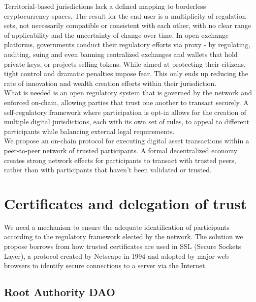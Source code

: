 \documentclass[10pt]{article}
\begin{document}
\noindent Territorial-based jurisdictions lack a defined mapping to borderless cryptocurrency spaces. The result for the end user is a multiplicity of regulation sets, not necessarily compatible or consistent with each other, with no clear range of applicability and the uncertainty of change over time. In open exchange platforms, governments conduct their regulatory efforts via proxy - by regulating, auditing, suing and even banning\cite{scmp} centralized exchanges and wallets that hold private keys\cite{coinbase}, or projects selling tokens\cite{zerox}. While aimed at protecting their citizens, tight control and dramatic penalties impose fear. This only ends up reducing the rate of innovation and wealth creation efforts within their jurisdiction.\\

\noindent What is needed is an open regulatory system that is governed by the network and enforced on-chain, allowing parties that trust one another to transact securely. A self-regulatory framework where participation is opt-in allows for the creation of multiple digital jurisdictions, each with its own set of rules, to appeal to different participants while balancing external legal requirements.   \\

\noindent We propose an on-chain protocol for executing digital asset transactions within a peer-to-peer network of trusted participants. A formal decentralized economy creates strong network effects for participants to transact with trusted peers, rather than with participants that haven’t been validated or trusted. \\

\section{Certificates and delegation of trust}

We need a mechanism to ensure the adequate identification of participants according to the regulatory framework elected by the network. The solution we propose borrows from how trusted certificates are used in SSL (Secure Sockets Layer)\cite{digicert}, a protocol created by Netscape in 1994 and adopted by major web browsers to identify secure connections to a server via the Internet\cite{evssl}. \\

\subsection{Root Authority DAO}
\end{document}
